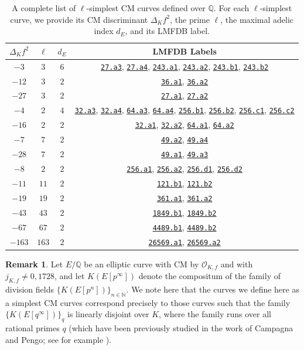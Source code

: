 \documentclass[11pt]{amsart}
\theoremstyle{definition}
\newtheorem{remark}[defn]{Remark}
\newcommand{\Q}{\mathbb{Q}}
\newcommand{\N}{\mathbb{N}}
\newcommand{\Of}{\mathcal{O}_{K,f}}
\newcommand{\eclabel}[1]{\href{https://www.lmfdb.org/EllipticCurve/Q/#1}{\texttt{#1}}}
\begin{document}
\begin{center}
\begin{table}
\caption{A complete list of $\ell$-simplest CM curves defined over $\Q$. For each $\ell$-simplest curve, we provide its CM discriminant $\Delta_K f^2$, the prime $\ell$, the maximal adelic index $d_E$, and its LMFDB label.}\label{simplesttable}
\begin{tabular}{|c|c|c|c|}
\hline
$\Delta_K f^2$ & $\ell$ & $d_E$ & LMFDB Labels \\
\hline
$-3$ & $3$ & $6$ & \eclabel{27.a3}, \eclabel{27.a4}, \eclabel{243.a1}, \eclabel{243.a2}, \eclabel{243.b1}, \eclabel{243.b2}  \\
\hline
$-12$ & $3$ & $2$ & \eclabel{36.a1}, \eclabel{36.a2}  \\
\hline
$-27$ & $3$ & $2$ & \eclabel{27.a1}, \eclabel{27.a2}  \\
\hline
$-4$ & $2$ & $4$ & \eclabel{32.a3}, \eclabel{32.a4}, \eclabel{64.a3}, \eclabel{64.a4}, \eclabel{256.b1}, \eclabel{256.b2}, \eclabel{256.c1}, \eclabel{256.c2}  \\
\hline
$-16$ & $2$ & $2$ & \eclabel{32.a1}, \eclabel{32.a2}, \eclabel{64.a1}, \eclabel{64.a2}    \\
\hline
$-7$ & $7$ & $2$ & \eclabel{49.a2}, \eclabel{49.a4}  \\
\hline
$-28$ & $7$ & $2$ & \eclabel{49.a1}, \eclabel{49.a3}   \\
\hline
$-8$ & $2$ & $2$ & \eclabel{256.a1}, \eclabel{256.a2}, \eclabel{256.d1}, \eclabel{256.d2}  \\
\hline
$-11$ & $11$ & $2$ & \eclabel{121.b1}, \eclabel{121.b2}  \\
\hline
$-19$ & $19$ & $2$ & \eclabel{361.a1}, \eclabel{361.a2}  \\
\hline
$-43$ & $43$ & $2$ & \eclabel{1849.b1}, \eclabel{1849.b2}   \\
\hline
$-67$ & $67$ & $2$ & \eclabel{4489.b1}, \eclabel{4489.b2}   \\
\hline
$-163$ & $163$ & $2$ & \eclabel{26569.a1}, \eclabel{26569.a2}   \\
\hline
\end{tabular}
\end{table}
\end{center}

\begin{remark}
    Let $E/\Q$ be an elliptic curve with CM by $\Of$ and with $j_{K, f} \neq 0, 1728$, and let $K(E[p^{\infty}])$ denote the compositum of the family of division fields $\{ K(E[p^n])\}_{n \in \N}$. We note here that the curves we define here as a simplest CM curves correspond precisely to those curves such that the family $\{ K(E[q^{\infty}])\}_{q}$ is linearly disjoint over $K$, where the family runs over all rational primes $q$ (which have been previously studied in the work of Campagna and Pengo; see for example \cite[Theorem 6.3]{CampagnaPengo1}).
\end{remark}
\end{document}
